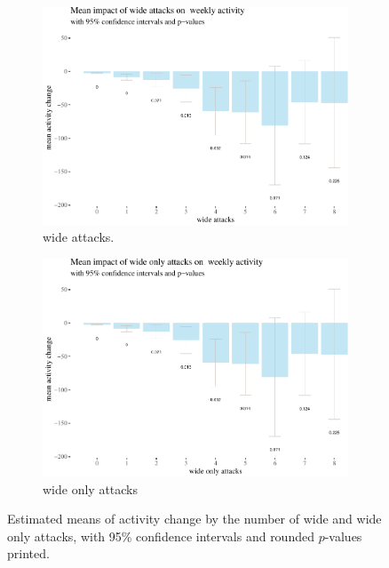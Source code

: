 \documentclass[10pt,]{scrartcl}
\begin{document}
\begin{figure}[h!]

\centering
\begin{subfigure}[t]{0.75\textwidth}

\begin{center}\includegraphics[width=1\linewidth]{redditAnalysisWalkthrough_files/figure-latex/unnamed-chunk-31-1} \end{center}
\caption{wide attacks.}
\end{subfigure}
 
\begin{subfigure}[t]{0.75\textwidth}

\begin{center}\includegraphics[width=1\linewidth]{redditAnalysisWalkthrough_files/figure-latex/unnamed-chunk-32-1} \end{center}
\caption{wide only attacks}
\end{subfigure}

\caption{Estimated means of activity change by the number of wide and wide only attacks, with 95\% confidence intervals and rounded $p$-values printed.}
\label{fig:lowerTableBars}
\end{figure}
\end{document}
